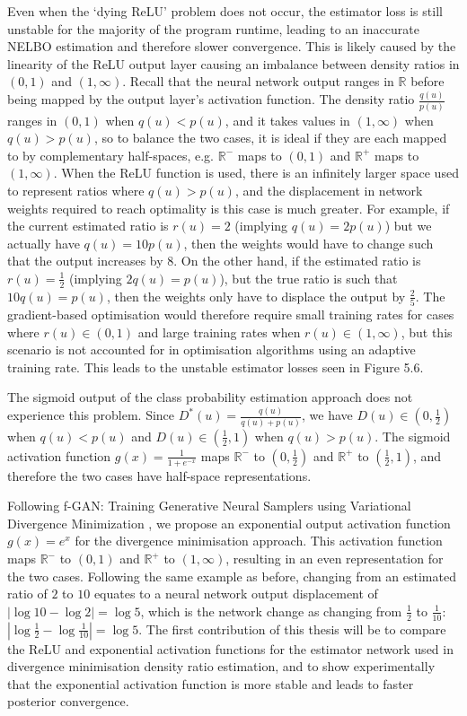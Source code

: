 \documentclass[honours,12pt]{unswthesis}
\newcommand{\R}{\mathbb{R}}
\numberwithin{equation}{section}
\theoremstyle{definition}
\begin{document}
Even when the `dying ReLU' problem does not occur, the estimator loss is still unstable for the majority of the program runtime, leading to an inaccurate NELBO estimation and therefore slower convergence. This is likely caused by the linearity of the ReLU output layer causing an imbalance between density ratios in $(0,1)$ and $(1,\infty)$. Recall that the neural network output ranges in $\R$ before being mapped by the output layer's activation function. The density ratio $\frac{q(u)}{p(u)}$ ranges in $(0,1)$ when $q(u)<p(u)$, and it takes values in $(1,\infty)$ when $q(u)>p(u)$, so to balance the two cases, it is ideal if they are each mapped to by complementary half-spaces, e.g. $\R^-$ maps to $(0,1)$ and $\R^+$ maps to $(1,\infty)$. When the ReLU function is used, there is an infinitely larger space used to represent ratios where $q(u)>p(u)$, and the displacement in network weights required to reach optimality is this case is much greater. For example, if the current estimated ratio is $r(u)=2$ (implying $q(u)=2p(u)$) but we actually have $q(u)=10p(u)$, then the weights would have to change such that the output increases by $8$. On the other hand, if the estimated ratio is $r(u)=\frac12$ (implying $2q(u)=p(u)$), but the true ratio is such that $10q(u)=p(u)$, then the weights only have to displace the output by $\frac25$. The gradient-based optimisation would therefore require small training rates for cases where $r(u)\in (0,1)$ and large training rates when $r(u)\in(1,\infty)$, but this scenario is not accounted for in optimisation algorithms using an adaptive training rate. This leads to the unstable estimator losses seen in Figure 5.6.

The sigmoid output of the class probability estimation approach does not experience this problem. Since $D^*(u)=\frac{q(u)}{q(u)+p(u)}$, we have $D(u)\in(0,\frac12)$ when $q(u)<p(u)$ and $D(u)\in(\frac12,1)$ when $q(u)>p(u)$. The sigmoid activation function $g(x)=\frac{1}{1+e^{-x}}$ maps $\R^-$ to $(0,\frac12)$ and $\R^+$ to $(\frac12,1)$, and therefore the two cases have half-space representations.

Following f-GAN: Training Generative Neural Samplers using Variational Divergence Minimization \citep{nowozin}, we propose an exponential output activation function $g(x)=e^x$ for the divergence minimisation approach. This activation function maps $\R^-$ to $(0,1)$ and $\R^+$ to $(1,\infty)$, resulting in an even representation for the two cases. Following the same example as before, changing from an estimated ratio of $2$ to $10$ equates to a neural network output displacement of $|\log 10-\log 2|=\log 5$, which is the network change as changing from $\frac12$ to $\frac{1}{10}$: $|\log \frac12-\log\frac{1}{10}|=\log 5$. The first contribution of this thesis will be to compare the ReLU and exponential activation functions for the estimator network used in divergence minimisation density ratio estimation, and to show experimentally that the exponential activation function is more stable and leads to faster posterior convergence.
\end{document}
